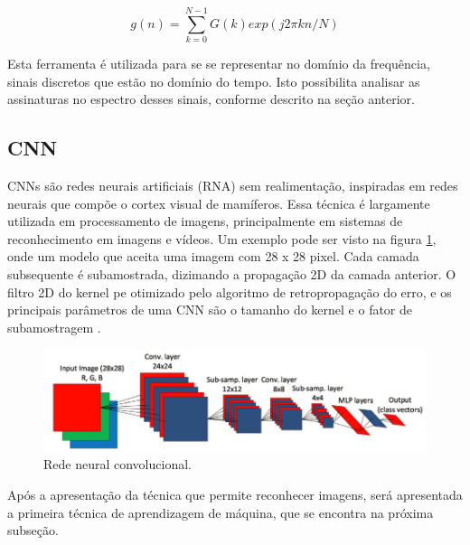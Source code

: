 \begin{equation}\label{eq:dft}
    g(n)=\sum_{k=0}^{N-1} G(k)exp(j2\pi kn/N)
\end{equation}

Esta ferramenta é utilizada para se se representar no domínio da frequência, sinais discretos que estão no domínio do tempo. Isto 
possibilita analisar as assinaturas no espectro desses sinais, conforme descrito na seção anterior.


% 

\subsection{CNN}

CNNs são redes neurais artificiais (RNA) sem realimentação, inspiradas em redes neurais que compõe o cortex visual de mamíferos. Essa
técnica é largamente utilizada em processamento de imagens, principalmente em sistemas de reconhecimento em imagens e vídeos. Um exemplo
pode ser visto na figura \ref{fig:cnn_image_ince_p5}, onde um modelo que aceita uma imagem com 28 x 28 pixel. Cada camada subsequente é
subamostrada, dizimando a propagação 2D da camada anterior. O filtro 2D do kernel pe otimizado pelo algoritmo de retropropagação do erro, 
e os principais parâmetros de uma CNN são o tamanho do kernel e o fator de subamostragem \cite{Ince2016}.

\begin{figure}[H]
    \caption{Rede neural convolucional.}
    \begin{center}
        \includegraphics[scale=.4]{referencial/img/cnn_image_ince_p5.png}
    \end{center}
    \label{fig:cnn_image_ince_p5}
\end{figure}

Após a apresentação da técnica que permite reconhecer imagens, será apresentada a primeira técnica de aprendizagem de máquina, que se
encontra na próxima subseção.


